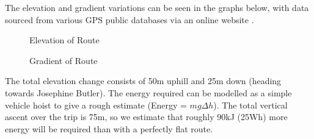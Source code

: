 \documentclass[journal,10pt]{IEEEtran}
\begin{document}
            The elevation and gradient variations can be seen in the graphs below, with data sourced from various GPS public databases via an online website \cite{GPSDatabase}.
            \begin{figure}[H]
                \centering
                \caption{Elevation of Route}
                \label{fig:elevation}
            \end{figure}
            \begin{figure}[H]
                \centering
                \caption{Gradient of Route}
                \label{fig:gradient}
            \end{figure}
            The total elevation change consists of 50m uphill and 25m down (heading towards Josephine Butler). The energy required can be modelled as a simple vehicle hoist to give a rough estimate (Energy = $mg\Delta h$). The total vertical ascent over the trip is 75m, so we estimate that roughly 90kJ (25Wh) more energy will be required than with a perfectly flat route.
\end{document}
